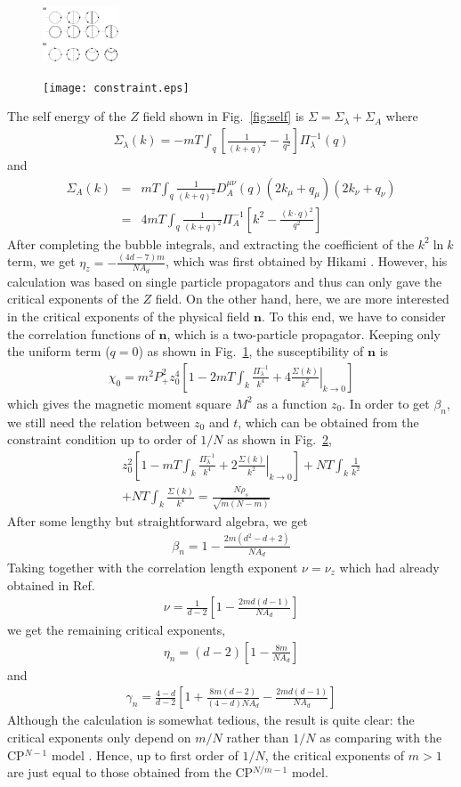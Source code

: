 \documentclass[aps,twocolumn,superscriptaddress]{revtex4-1}
\newcommand{\bea}{\begin{eqnarray}}
\newcommand{\eea}{\end{eqnarray}}
\newcommand{\bn}{\mathbf{n}}
\begin{document}
\begin{figure}
\includegraphics[width=0.2\textwidth]{suscept.eps}
\caption{\label{fig:suscept}}
\end{figure}
\begin{figure}
\texttt{[image: constraint.eps]}
\caption{\label{fig:constraint}}
\end{figure}
The self energy of the $Z$ field shown in Fig.~\ref{fig:self} is $\Sigma=\Sigma_\lambda+\Sigma_A$ where \bea
\Sigma_\lambda(k)=-mT\int_q \left[\frac{1}{(k+q)^2}-\frac{1}{q^2}\right]\Pi_\lambda^{-1}(q) \eea and \bea \Sigma_A(k)
&=& mT\int_q \frac{1}{(k+q)^2} D_A^{\mu\nu}(q) (2k_\mu+q_\mu) (2k_\nu+q_\nu) \nonumber \\&=& 4mT\int_q
\frac{1}{(k+q)^2}\Pi_A^{-1}\left[ k^2-\frac{(k\cdot q)^2}{q^2} \right] \eea After completing the bubble integrals, and
extracting the coefficient of the $k^2\ln k$ term, we get $\eta_z=-\frac{(4d-7)m}{NA_d}$, which was first obtained by
Hikami \cite{hikami1980}. However, his calculation was based on single particle propagators and thus can only gave the
critical exponents of the $Z$ field. On the other hand, here, we are more interested in the critical exponents of the
physical field $\bn$. To this end, we have to consider the correlation functions of $\bn$, which is a two-particle
propagator. Keeping only the uniform term ($q=0$) as shown in Fig.~\ref{fig:suscept}, the susceptibility of $\bn$ is
\bea \chi_0=m^2P_+^2 z_0^4\left[ 1-  2mT\int_k \frac{\Pi_\lambda^{-1}}{k^4} + 4
\left.\frac{\Sigma(k)}{k^2}\right|_{k\rightarrow0} \right] \eea which gives the magnetic moment square $M^2$ as a
function $z_0$. In order to get $\beta_n$, we still need the relation between $z_0$ and $t$, which can be obtained
from the constraint condition up to order of $1/N$ as shown in Fig.~\ref{fig:constraint}, \bea &&z_0^2 \left[ 1-
mT\int_k \frac{\Pi_\lambda^{-1}}{k^4} + 2 \left.\frac{\Sigma(k)}{k^2}\right|_{k\rightarrow0}\right] + NT\int_k
\frac{1}{k^2} \nonumber\\&&+ NT\int_k \frac{\Sigma(k)}{k^4} = \frac{N\rho_s}{\sqrt{m(N-m)}} \eea After some lengthy
but straightforward algebra, we get \bea \beta_n=1-\frac{2m(d^2-d+2)}{NA_d} \eea Taking together with the
correlation length exponent $\nu=\nu_z$ which had already obtained in Ref.~\cite{hikami1980} \bea
\nu=\frac{1}{d-2}\left[ 1-\frac{2md(d-1)}{NA_d} \right] \eea we get the remaining critical exponents, \bea
\eta_n=(d-2)\left[1-\frac{8m}{NA_d}\right] \eea and \bea \gamma_n=\frac{4-d}{d-2}\left[
1+\frac{8m(d-2)}{(4-d)NA_d}-\frac{2md(d-1)}{NA_d} \right] \eea Although the calculation is somewhat tedious, the
result is quite clear: the critical exponents only depend on $m/N$ rather than $1/N$ as comparing with the
CP$^{N-1}$ model \cite{irkhin1996}. Hence, up to first order of $1/N$, the critical exponents of $m>1$ are just
equal to those obtained from the CP$^{N/m-1}$ model. 
\end{document}
